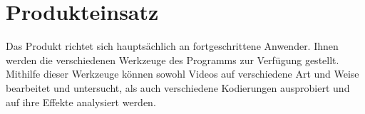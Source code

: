 \section{Produkteinsatz}

Das Produkt richtet sich hauptsächlich an fortgeschrittene Anwender. Ihnen werden die verschiedenen Werkzeuge des Programms zur Verfügung gestellt. Mithilfe dieser Werkzeuge können sowohl Videos auf verschiedene Art und Weise bearbeitet und untersucht, als auch verschiedene Kodierungen ausprobiert und auf ihre Effekte analysiert werden.
